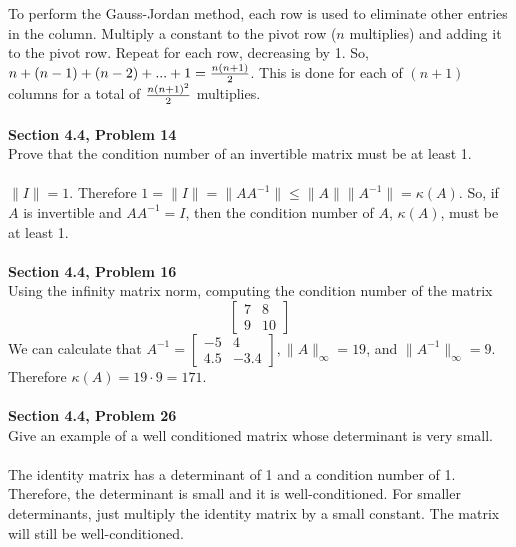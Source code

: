 \documentclass[11pt]{article}
\begin{document}
To perform the Gauss-Jordan method, each row is used to eliminate other
entries in the column. Multiply a constant to the pivot row ($n$ multiplies)
and adding it to the pivot row. Repeat for each row, decreasing by 1.
So, $n + (n-1) + (n-2) + ... + 1 = {n(n+1) \over 2}$. This is done for
each of $(n+1)$ columns for a total of ${n(n+1)^2 \over 2}$ multiplies.\\
\\ 
\noindent\textbf{Section 4.4, Problem 14}\\
Prove that the condition number of an invertible matrix must be at least
1.\\
\\
$\|I\| = 1$. Therefore $1 = \|I\| = \|AA^{-1}\| \le \|A\| \|A^{-1}\| = 
\kappa(A)$. So, if $A$ is invertible and $AA^{-1} = I$, then the
condition number of $A$, $\kappa(A)$, must be at least 1.\\
\\
\noindent\textbf{Section 4.4, Problem 16}\\
Using the infinity matrix norm, computing the condition number of the matrix
\[
\begin{bmatrix}
 7 & 8 \\
 9 & 10 
\end {bmatrix} 
\]
We can calculate that $A^{-1} = 
\begin{bmatrix}
 -5 & 4 \\
 4.5 & -3.4
\end{bmatrix},  
\|A\|_{\infty} = 19$, and $\|A^{-1}\|_{\infty} = 9$. Therefore $\kappa(A) = 
19 \cdot 9 = 171$.\\
\\
\noindent\textbf{Section 4.4, Problem 26}\\ 
Give an example of a well conditioned matrix whose determinant is very
small.\\
\\
The identity matrix has a determinant of 1 and a condition number of 1.
Therefore, the determinant is small and it is well-conditioned. For
smaller determinants, just multiply the identity matrix by a small
constant. The matrix will still be well-conditioned. 
\end{document}
